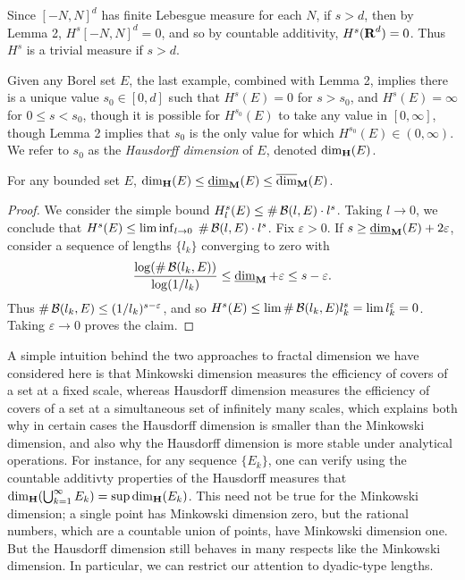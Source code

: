 \begin{example}
	Since $[-N,N]^d$ has finite Lebesgue measure for each $N$, if $s > d$, then by Lemma 2, $H^s[-N,N]^d = 0$, and so by countable additivity, $H^s(\operatorname{\mathbf{R}}^d) = 0$. Thus $H^s$ is a trivial measure if $s > d$.
\end{example}

Given any Borel set $E$, the last example, combined with Lemma 2, implies there is a unique value $s_0 \in [0,d]$ such that $H^s(E) = 0$ for $s > s_0$, and $H^s(E) = \infty$ for $0 \leq s < s_0$, though it is possible for $H^{s_0}(E)$ to take any value in $[0,\infty]$, though Lemma 2 implies that $s_0$ is the only value for which $H^{s_0}(E) \in (0,\infty)$. We refer to $s_0$ as the \emph{Hausdorff dimension} of $E$, denoted $\operatorname{\dim_{\mathbf{H}}}(E)$.

\begin{theorem}
	For any bounded set $E$, $\operatorname{\dim_{\mathbf{H}}}(E) \leq \operatorname{\underline{\dim}_{\mathbf{M}}}(E) \leq \operatorname{\overline{\dim}_{\mathbf{M}}}(E)$.
\end{theorem}
\begin{proof}
	We consider the simple bound $H^s_l(E) \leq \# \operatorname{\mathcal{B}}(l,E) \cdot l^s$. Taking $l \to 0$, we conclude that $H^s(E) \leq \liminf_{l \to 0}\; \# \operatorname{\mathcal{B}}(l,E) \cdot l^s$. Fix $\varepsilon > 0$. If $s \geq \operatorname{\underline{\dim}_{\mathbf{M}}}(E) + 2\varepsilon$, consider a sequence of lengths $\{ l_k \}$ converging to zero with
	\[ \frac{\log(\# \operatorname{\mathcal{B}}(l_k,E))}{\log(1/l_k)} \leq \operatorname{\underline{\dim}_{\mathbf{M}}} + \varepsilon \leq s - \varepsilon. \]
	Thus $\# \operatorname{\mathcal{B}}(l_k,E) \leq (1/l_k)^{s - \varepsilon}$, and so $H^s(E) \leq \lim \# \operatorname{\mathcal{B}}(l_k,E) l_k^s = \lim l_k^\varepsilon = 0$. Taking $\varepsilon \to 0$ proves the claim.
\end{proof}

A simple intuition behind the two approaches to fractal dimension we have considered here is that Minkowski dimension measures the efficiency of covers of a set at a fixed scale, whereas Hausdorff dimension measures the efficiency of covers of a set at a simultaneous set of infinitely many scales, which explains both why in certain cases the Hausdorff dimension is smaller than the Minkowski dimension, and also why the Hausdorff dimension is more stable under analytical operations. For instance, for any sequence $\{ E_k \}$, one can verify using the countable additivty properties of the Hausdorff measures that $\operatorname{\dim_{\mathbf{H}}}(\bigcup_{k = 1}^\infty E_k) = \sup \operatorname{\dim_{\mathbf{H}}}(E_k)$. This need not be true for the Minkowski dimension; a single point has Minkowski dimension zero, but the rational numbers, which are a countable union of points, have Minkowski dimension one. But the Hausdorff dimension still behaves in many respects like the Minkowski dimension. In particular, we can restrict our attention to dyadic-type lengths.

